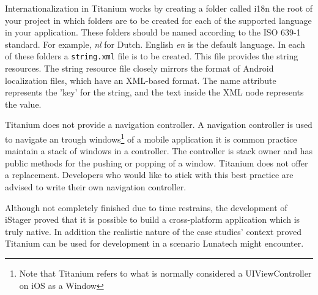 
Internationalization in Titanium works by creating a folder called i18n the root of your project in which folders are to be created for each of the supported language in your application. These folders should be named according to the  ISO 639-1 standard. For example, \emph{nl} for Dutch. English \emph{en} is the default language. In each of these folders a \texttt{string.xml} file is to be created. This file provides the string resources. The string resource file closely mirrors the format of Android localization files, which have an XML-based format. The name attribute represents the 'key' for the string, and the text inside the XML node represents the value. %

Titanium does not provide a navigation controller. A navigation controller is used to navigate an trough windows\footnote{Note that Titanium refers to what is normally considered a UIViewController on iOS as a Window} of a mobile application it is common practice maintain a stack of windows in a controller. The controller is stack owner and has public methods for the pushing or popping of a window. 
Titanium does not offer a replacement. Developers who would like to stick with this best practice are advised to write their own navigation controller. %


Although not completely finished due to time restrains, the development of iStager proved that it is possible to build a cross-platform application which is truly native. In addition the realistic nature of the case studies' context proved Titanium can be used for development in a scenario Lunatech might encounter. 